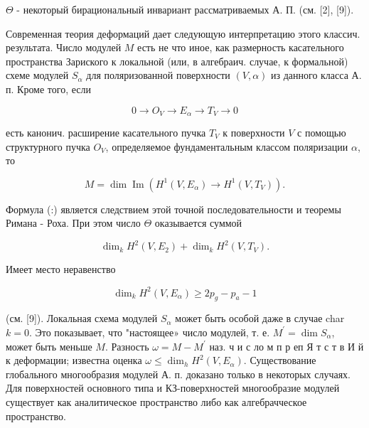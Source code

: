 \documentclass[10pt]{article}
\begin{document}
$\Theta$ - некоторый бирациональный инвариант рассматриваемых А. П. (см. [2], [9]).



Современная теория деформаций дает следующую интерпретацию этого классич. результата. Число модулей $M$ есть не что иное, как размерность касательного пространства Зариского к локальной (или, в алгебраич. случае, к формальной) схеме модулей $S_{\alpha}$ для поляризованной поверхности $(V, \alpha)$ из данного класса А. п. Кроме того, если



\[

0 \longrightarrow O_{V} \longrightarrow E_{\alpha} \longrightarrow T_{V} \longrightarrow 0

\]



есть канонич. расширение касательного пучка $T_{V}$ к поверхности $V$ с помощью структурного пучка $O_{V}$, определяемое фундаментальным классом поляризации $\alpha$, то



\[

M=\operatorname{dim} \operatorname{Im}\left(H^{1}\left(V, E_{\alpha}\right) \longrightarrow H^{1}\left(V, T_{V}\right)\right) .

\]



Формула (:) является следствием этой точной последовательности и теоремы Римана - Роха. При этом число $\Theta$ оказывается суммой



\[

\operatorname{dim}_{k} H^{2}\left(V, E_{2}\right)+\operatorname{dim}_{k} H^{2}\left(V, T_{V}\right) .

\]



Имеет место неравенство



\[

\operatorname{dim}_{k} H^{2}\left(V, E_{\alpha}\right) \geqslant 2 p_{g}-p_{a}-1

\]



(см. [9]). Локальная схема модулей $S_{\alpha}$ может быть особой даже в случае char $k=0$. Это показывает, что "настоящее» число модулей, т. е. $M^{\prime}=\operatorname{dim} S_{\alpha}$, может быть меньше $M$. Разность $\omega=M-M^{\prime}$ наз. ч и с ло м п р еп Я т с т в И й к деформации; известна оценка $\omega \leqslant \operatorname{dim}_{h} H^{2}\left(V, E_{\alpha}\right)$. Существование глобального многообразия модулей А. п. доказано только в некоторых случаях. Для поверхностей основного типа и КЗ-поверхностей многообразие модулей существует как аналитическое пространство либо как алгебрачческое пространство.
\end{document}
